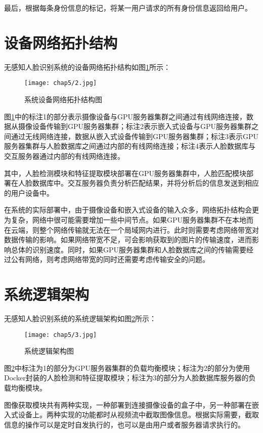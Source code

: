 最后，根据每条身份信息的标记，将某一用户请求的所有身份信息返回给用户。

\section{设备网络拓扑结构}

无感知人脸识别系统的设备网络拓扑结构如图\ref{fig:chap5:phy}所示：

\begin{figure}[!htp]
	\centering
	\texttt{[image: chap5/2.jpg]}
	\caption{系统设备网络拓扑结构图}
	\label{fig:chap5:phy}
\end{figure}

图\ref{fig:chap5:phy}中的标注1的部分表示摄像设备与GPU服务器集群之间通过有线网络连接，数据从摄像设备传输到GPU服务器集群；标注2表示嵌入式设备与GPU服务器集群之间通过无线网络连接，数据从嵌入式设备传输到GPU服务器集群；标注3表示GPU服务器集群与人脸数据库之间通过内部的有线网络连接；标注4表示人脸数据库与交互服务器通过内部的有线网络连接。

其中，人脸检测模块和特征提取模块部署在GPU服务器集群中，人脸匹配模块部署在人脸数据库中。交互服务器负责分析匹配结果，并将分析后的信息发送到相应的用户设备中。

在系统的实际部署中，由于摄像设备和嵌入式设备的输入众多，网络拓扑结构会更为复杂，网络中很可能需要增加一些中间节点。如果GPU服务器集群不在本地而在云端，则整个网络传输就无法在一个局域网内进行。此时则需要考虑网络带宽对数据传输的影响。如果网络带宽不足，可会影响获取到的图片的传输速度，进而影响总体的识别速度。同时，如果GPU服务器集群和人脸数据库之间的传输需要经过公有网络，则考虑网络带宽的同时还需要考虑传输安全的问题。


\section{系统逻辑架构}

无感知人脸识别系统的系统逻辑架构如图\ref{fig:chap5:logic}所示：

\begin{figure}[!htp]
	\centering
	\texttt{[image: chap5/3.jpg]}
	\caption{系统逻辑架构图}
	\label{fig:chap5:logic}
\end{figure}

图\ref{fig:chap5:logic}中标注为1的部分为GPU服务器集群的负载均衡模块；标注为2的部分为使用Docker封装的人脸检测和特征提取模块；标注为3的部分为人脸数据库服务器的负载均衡模块。

图像获取模块共有两种实现，一种部署到连接摄像设备的盒子中，另一种部署在嵌入式设备上。两种实现的功能都时从视频流中截取图像信息。根据实际需要，截取信息的操作可以是定时自发执行的，也可以是由用户或者服务器请求执行的。

